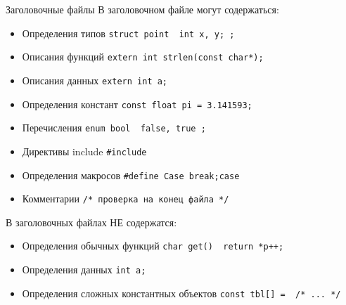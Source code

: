 \documentclass{beamer}
\begin{document}
\begin{frame}{Заголовочные файлы}
    В заголовочном файле могут содержаться:
    \begin{itemize}
    \item Определения типов \texttt{struct point { int x, y; };}
    \item Описания функций \texttt{extern int strlen(const char*);}
    \item Описания данных \texttt{extern int a;}
    \item Определения констант \texttt{const float pi = 3.141593;}
    \item Перечисления \texttt{enum bool { false, true };}
    \item Директивы include \texttt{\#include}
    \item Определения макросов \texttt{\#define Case break;case}
    \item Комментарии \texttt{/* проверка на конец файла */}
    \end{itemize}

    В заголовочных файлах НЕ содержатся:
    \begin{itemize}
        \item Определения обычных функций \texttt{char get() { return *p++; }}
        \item Определения данных \texttt{int a;}
        \item Определения сложных константных объектов \texttt{const tbl[] = { /* ... */ }}
    \end{itemize}
    \end{frame}
\end{document}
